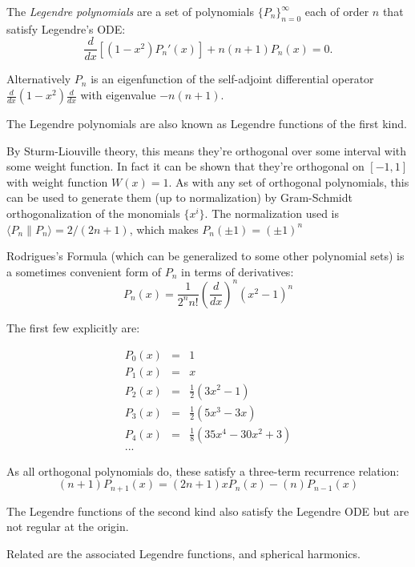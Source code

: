 \documentclass[12pt]{article}
\begin{document}
The \emph{Legendre polynomials} are a set of polynomials $\{P_n\}_{n=0}^{\infty}$ each of order $n$ that satisfy Legendre's ODE: $$\frac{d}{dx}[(1-x^2) P_n'(x)] + n(n+1)P_n(x) = 0.$$

Alternatively $P_n$ is an eigenfunction of the self-adjoint differential operator $\frac{d}{dx}(1-x^2) \frac{d}{dx}$ with eigenvalue $-n(n+1)$.

The Legendre polynomials are also known as Legendre functions of the first kind.

By Sturm-Liouville theory, this means they're orthogonal over some interval with
some weight function.  In fact it can be shown that they're orthogonal on $[-1, 1]$ with weight function $W(x) = 1$.  As with any set of orthogonal polynomials, this can be used to generate them (up to normalization) by Gram-Schmidt orthogonalization of the monomials $\{x^i\}$.  The normalization used
is $\langle P_n \| P_n \rangle = 2 / (2n + 1)$, which makes $P_n(\pm 1) = (\pm 1)^n$

Rodrigues's Formula (which can be generalized to some other polynomial sets) is a sometimes convenient form of $P_n$ in terms of derivatives:
$$P_n(x) = \frac{1}{2^n n!} \left( \frac{d}{dx} \right)^n (x^2 - 1)^n$$

The first few explicitly are: 

\begin{eqnarray*}
P_0(x) &=& 1 \\
P_1(x) &=& x \\
P_2(x) &=& \frac{1}{2} (3x^2 - 1) \\
P_3(x) &=& \frac{1}{2} (5x^3 - 3x) \\
P_4(x) &=& \frac{1}{8} (35x^4 - 30x^2 + 3) \\
...
\end{eqnarray*}

As all orthogonal polynomials do, these satisfy a three-term recurrence relation:
$$(n+1)P_{n+1}(x) = (2n+1)xP_{n}(x) - (n)P_{n-1}(x)$$

The Legendre functions of the second kind also satisfy the Legendre ODE but are not regular at the origin.

Related are the associated Legendre functions, and spherical harmonics.
\end{document}
